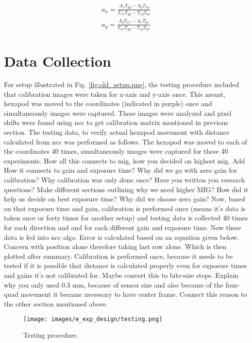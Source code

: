 \begin{equation}\label{eqn:dist_calc}
    \begin{aligned}
        a_x = \frac{A_xT_{yy} - A_yT_{xy}}{T_{xx}T_{yy} - T_{xy}T_{yx}} \\
        a_y = \frac{A_yT_{xx} - A_xT_{yx}}{T_{xx}T_{yy} - T_{xy}T_{yx}}
    \end{aligned}
\end{equation}

\section{Data Collection}\label{section:data_collection}
For setup illustrated in Fig. \ref{fig:old_setup.png}, the testing procedure included that calibration images were taken for x-axis and y-axis once. This meant, hexapod was moved to the coordinates (indicated in purple) once and simultaneously images were captured. These images were analyzed and pixel shifts were found using \gls{ncc} to get calibration matrix mentioned in previous section. The testing data, to verify actual hexapod movement with distance calculated from \gls{ncc} was performed as follows. The hexapod was moved to each of the coordinates 40 times, simultaneously images were captured for these 40 experiments. How all this connects to \gls{mig}, how you decided on highest \gls{mig}. Add How it connects to gain and exposure time? Why did we go with zero gain for calibration? Why calibration was only done once? Have you written you research questions? Make different sections outlining why we need higher MIG? How did it help us decide on best exposure time? Why did we choose zero gain? Now, based on that exposure time and gain, calibration is performed once (means it's data is taken once or forty times for another setup) and testing data is collected 40 times for each direction and and for each different gain and exposure time. Now these data is fed into ncc algo. Error is calculated based on an equation given below. Concern with position alone therefore taking last row alone. Which is then plotted after summary. Calibration is performed once, because it needs to be tested if it is possible that distance is calculated properly even for exposure times and gains it's not calibrated for. Maybe convert this to bite-size steps. Explain why you only used 0.3 mm, because of sensor size and also because of the four-quad movement it became necessary to have center frame. Connect this reason to the other section mentioned above. 
\begin{figure}[h]
    \centering
    \texttt{[image: images/e\_exp\_design/testing.png]}
    \caption{Testing procedure.}
    \label{fig:testing.png}
\end{figure}

